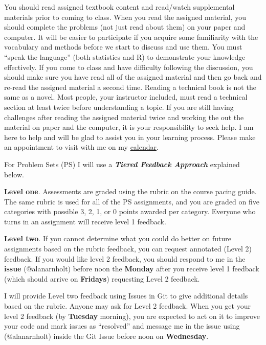 \documentclass[
]{article}
\begin{document}
You should read assigned textbook content and read/watch supplemental
materials prior to coming to class. When you read the assigned material,
you should complete the problems (not just read about them) on your
paper and computer. It will be easier to participate if you acquire some
familiarity with the vocabulary and methods before we start to discuss
and use them. You must ``speak the language'' (both statistics and R) to
demonstrate your knowledge effectively. If you come to class and have
difficulty following the discussion, you should make sure you have read
all of the assigned material and then go back and re-read the assigned
material a second time. Reading a technical book is not the same as a
novel. Most people, your instructor included, must read a technical
section at least twice before understanding a topic. If you are still
having challenges after reading the assigned material twice and working
the out the material on paper and the computer, it is your
responsibility to seek help. I am here to help and will be glad to
assist you in your learning process. Please make an appointment to visit
with me on my
\href{https://calendar.google.com/calendar/u/0/selfsched?sstoken=UUtZb3I1Z1pFczdjfGRlZmF1bHR8MTZjOTU5MGY0ZTFlOTA2MmExNzhlYWQ5MGIzZWQ0OGM}{calendar}.

For Problem Sets (PS) I will use a \textbf{\emph{Tiered Feedback
Approach}} explained below.

\textbf{Level one}. Assessments are graded using the rubric on the
course pacing guide. The same rubric is used for all of the PS
assignments, and you are graded on five categories with possible 3, 2,
1, or 0 points awarded per category. Everyone who turns in an assignment
will receive level 1 feedback.

\textbf{Level two}. If you cannot determine what you could do better on
future assignments based on the rubric feedback, you can request
annotated (Level 2) feedback. If you would like level 2 feedback, you
should respond to me in the \textbf{issue} (@alanarnholt) before noon
the \textbf{Monday} after you receive level 1 feedback (which should
arrive on \textbf{Fridays}) requesting Level 2 feedback.

I will provide Level two feedback using Issues in Git to give additional
details based on the rubric. Anyone may ask for Level 2 feedback. When
you get your level 2 feedback (by \textbf{Tuesday} morning), you are
expected to act on it to improve your code and mark issues as
``resolved'' and message me in the issue using (@alanarnholt) inside the
Git Issue before noon on \textbf{Wednesday}.
\end{document}
